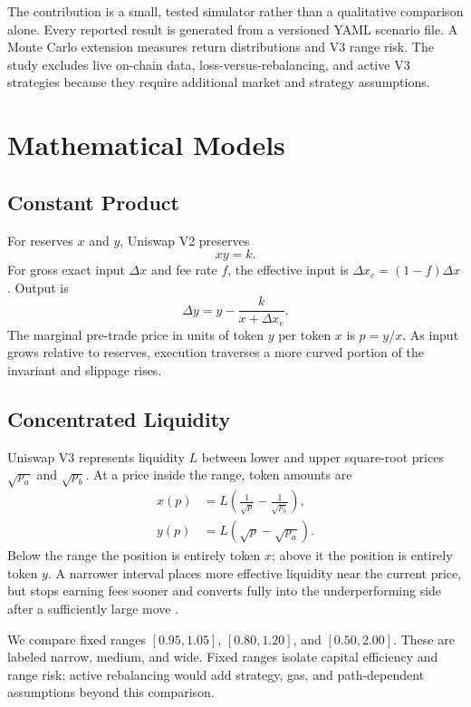 \documentclass[11pt,twocolumn]{article}
\begin{document}
The contribution is a small, tested simulator rather than a qualitative
comparison alone. Every reported result is generated from a versioned YAML
scenario file. A Monte Carlo extension measures return distributions and V3
range risk. The study excludes live on-chain data, loss-versus-rebalancing,
and active V3 strategies because they require additional market and strategy
assumptions.

\section{Mathematical Models}

\subsection{Constant Product}

For reserves $x$ and $y$, Uniswap V2 preserves
\begin{equation}
xy=k.
\end{equation}
For gross exact input $\Delta x$ and fee rate $f$, the effective input is
$\Delta x_e=(1-f)\Delta x$. Output is
\begin{equation}
\Delta y = y-\frac{k}{x+\Delta x_e}.
\end{equation}
The marginal pre-trade price in units of token $y$ per token $x$ is $p=y/x$.
As input grows relative to reserves, execution traverses a more curved portion
of the invariant and slippage rises.

\subsection{Concentrated Liquidity}

Uniswap V3 represents liquidity $L$ between lower and upper square-root prices
$\sqrt{p_a}$ and $\sqrt{p_b}$. At a price inside the range, token amounts are
\begin{align}
x(p)&=L\left(\frac{1}{\sqrt p}-\frac{1}{\sqrt{p_b}}\right),\\
y(p)&=L\left(\sqrt p-\sqrt{p_a}\right).
\end{align}
Below the range the position is entirely token $x$; above it the position is
entirely token $y$. A narrower interval places more effective liquidity near
the current price, but stops earning fees sooner and converts fully into the
underperforming side after a sufficiently large move \cite{univ3}.

We compare fixed ranges $[0.95,1.05]$, $[0.80,1.20]$, and $[0.50,2.00]$.
These are labeled narrow, medium, and wide. Fixed ranges isolate capital
efficiency and range risk; active rebalancing would add strategy, gas, and
path-dependent assumptions beyond this comparison.
\end{document}
